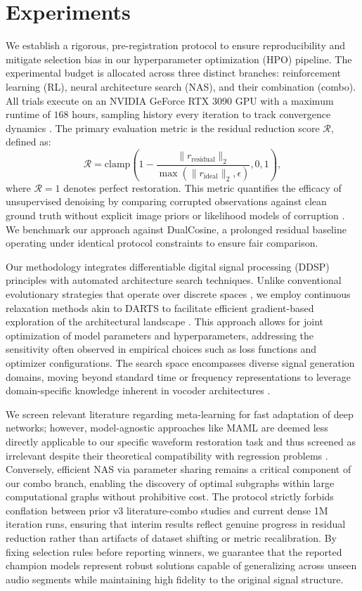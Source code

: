 \section{Experiments}

We establish a rigorous, pre-registration protocol to ensure reproducibility and mitigate selection bias in our hyperparameter optimization (HPO) pipeline. The experimental budget is allocated across three distinct branches: reinforcement learning (RL), neural architecture search (NAS), and their combination (combo). All trials execute on an NVIDIA GeForce RTX 3090 GPU with a maximum runtime of $168$ hours, sampling history every iteration to track convergence dynamics \cite{jaderberg2017pbt}. The primary evaluation metric is the residual reduction score $\mathcal{R}$, defined as:
\begin{equation}
    \mathcal{R} = \text{clamp}\left( 1 - \frac{\|r_{\text{residual}}\|_2}{\max(\|r_{\text{ideal}}\|_2, \epsilon)}, 0, 1 \right),
\end{equation}
where $\mathcal{R}=1$ denotes perfect restoration. This metric quantifies the efficacy of unsupervised denoising by comparing corrupted observations against clean ground truth without explicit image priors or likelihood models of corruption \cite{lehtinen2018n2n}. We benchmark our approach against DualCosine, a prolonged residual baseline operating under identical protocol constraints to ensure fair comparison.

Our methodology integrates differentiable digital signal processing (DDSP) principles with automated architecture search techniques. Unlike conventional evolutionary strategies that operate over discrete spaces \cite{elsken2019nas}, we employ continuous relaxation methods akin to DARTS to facilitate efficient gradient-based exploration of the architectural landscape \cite{liu2019darts}. This approach allows for joint optimization of model parameters and hyperparameters, addressing the sensitivity often observed in empirical choices such as loss functions and optimizer configurations. The search space encompasses diverse signal generation domains, moving beyond standard time or frequency representations to leverage domain-specific knowledge inherent in vocoder architectures \cite{engel2020ddsp}.

We screen relevant literature regarding meta-learning for fast adaptation of deep networks; however, model-agnostic approaches like MAML are deemed less directly applicable to our specific waveform restoration task and thus screened as irrelevant despite their theoretical compatibility with regression problems \cite{finn2017maml}. Conversely, efficient NAS via parameter sharing remains a critical component of our combo branch, enabling the discovery of optimal subgraphs within large computational graphs without prohibitive cost. The protocol strictly forbids conflation between prior v3 literature-combo studies and current dense 1M iteration runs, ensuring that interim results reflect genuine progress in residual reduction rather than artifacts of dataset shifting or metric recalibration. By fixing selection rules before reporting winners, we guarantee that the reported champion models represent robust solutions capable of generalizing across unseen audio segments while maintaining high fidelity to the original signal structure.
